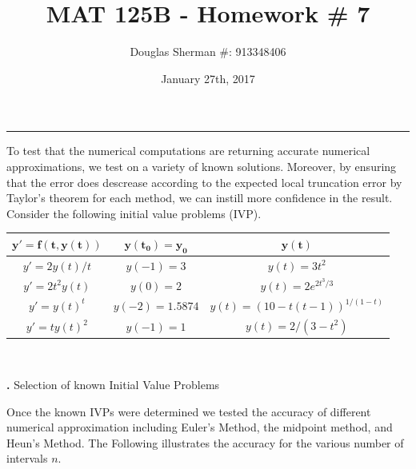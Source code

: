 \documentclass[11.5pt]{article}
\newcommand{\mbf}[1]{\mathbf{#1}}
\newcounter{tables}
\begin{document}
\title{MAT 125B - Homework \# 7}
\author{Douglas Sherman \#: 913348406}
\date{January 27th, 2017}
\maketitle
\rule{\textwidth}{1pt}
\lstset{style=small} %


To test that the numerical computations are returning accurate numerical approximations, we test on a variety of known solutions. Moreover, by ensuring that the error does descrease according to the expected local truncation error by Taylor's theorem for each method, we can instill more confidence in the result. Consider the following initial value problems (IVP).
\begin{center}
\begin{tabular}{|c|c|c|}
\hline
	$\mbf{y'=f(t,y(t))}$&$\mbf{y(t_0) = y_0}$	&$\mbf{y(t)}$	\\
\hline
	$y' = 2y(t)/t$&$y(-1)=3$	&$y(t) = 3t^2$		\\
\hline
$y' = 2t^2y(t)$	&$y(0) = 2$	&$y(t)=2e^{2t^3/3}$		\\
	\hline
	$y' = y(t)^t$	&$y(-2) = 1.5874$	&$y(t)=(10-t(t - 1))^{1/(1-t)}$		\\
	\hline
	$y' = ty(t)^2$	&$y(-1) = 1$	&$y(t)=2/(3 - t^2)$		\\
	\hline
\end{tabular}\\
\begin{scriptsize}
{\bf {}.} Selection of known Initial Value Problems
\end{scriptsize}
\end{center}
Once the known IVPs were determined we tested the accuracy of different numerical approximation including Euler's Method, the midpoint method, and Heun's Method. The Following illustrates the accuracy for the various number of intervals $n$. 
\end{document}
